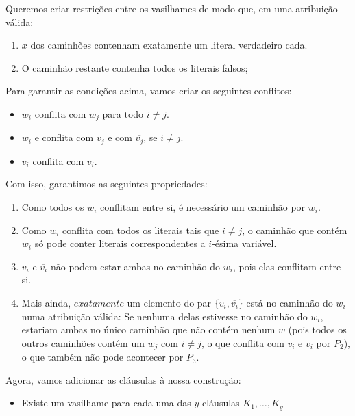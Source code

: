 \documentclass[11pt]{article}
\begin{document}
Queremos criar restrições entre os vasilhames de modo que, em uma
atribuição válida:

\begin{enumerate}
\item $x$ dos caminhões contenham exatamente um literal verdadeiro cada.
\item O caminhão restante contenha todos os literais falsos;
\end{enumerate}

Para garantir as condições acima, vamos criar os seguintes conflitos:
\begin{itemize}
\item $w_i$ conflita com $w_j$ para todo $i \neq j$.
\item $w_i$ e conflita com $v_j$ e com $\overline{v_j}$, se $i \neq j$.
\item $v_i$ conflita com $\overline{v_i}$.
\end{itemize}

Com isso, garantimos as seguintes propriedades:

\begin{enumerate}[($P_1$)]
\item Como todos os $w_i$ conflitam entre si, é necessário um
caminhão por $w_i$.

\item Como $w_i$ conflita com todos os literais tais que
$i \neq j$, o caminhão que contém $w_i$ só pode conter literais
correspondentes a $i$-ésima variável.

\item $v_i$ e $\overline{v_i}$ não
podem estar ambas no caminhão do $w_i$, pois elas conflitam entre si.

\item Mais ainda, $\textit{exatamente}$ um elemento do par $\{v_i,
\overline{v_i}\}$ está no caminhão do $w_i$ numa atribuição válida: Se
nenhuma delas estivesse no caminhão do $w_i$, estariam ambas no único
caminhão que não contém nenhum $w$ (pois todos os outros caminhões
contém um $w_j$ com $i \neq j$, o que conflita com $v_i$ e
$\overline{v_i}$ por $P_2$), o que também não pode acontecer por $P_3$.
\end{enumerate}



Agora, vamos adicionar as cláusulas à nossa construção:

\begin{itemize}
\item Existe um vasilhame para cada uma das $y$ cláusulas $K_1, \ldots, K_y$
\end{itemize}
\end{document}
